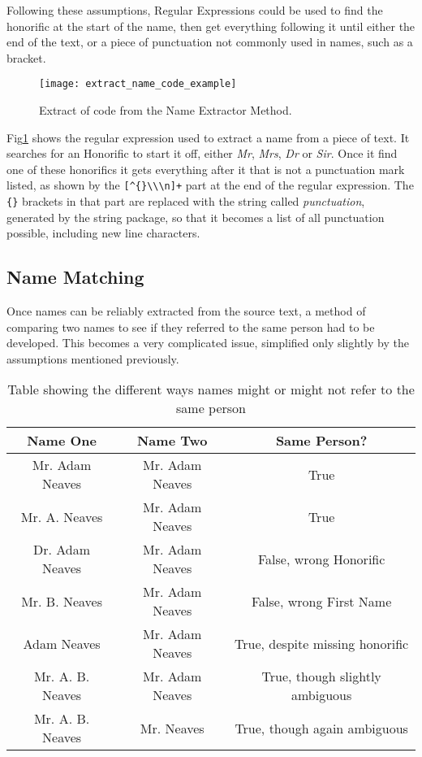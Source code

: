 Following these assumptions, Regular Expressions could be used to find the honorific at the start of the name, then get everything following it until either the end of the text, or a piece of punctuation not commonly used in names, such as a bracket.
\begin{figure}[ht]
\texttt{[image: extract\_name\_code\_example]}
\caption{Extract of code from the Name Extractor Method.}
\label{fig:name_extract_code}
\end{figure}

Fig\ref{fig:name_extract_code} shows the regular expression used to extract a name from a piece of text. It searches for an Honorific to start it off, either \emph{Mr}, \emph{Mrs}, \emph{Dr} or \emph{Sir}. Once it find one of these honorifics it gets everything after it that is not a punctuation mark listed, as shown by the \verb|[^{}\\\n]+| part at the end of the regular expression. The \verb|{}| brackets in that part are replaced with the string called \emph{punctuation}, generated by the string package, so that it becomes a list of all punctuation possible, including new line characters.  

\subsection{Name Matching}
\label{sec:imp_name_match}
Once names can be reliably extracted from the source text, a method of comparing two names to see if they referred to the same person had to be developed. This becomes a very complicated issue, simplified only slightly by the assumptions mentioned previously.

\begin{table}[ht!]
\centering
\begin{tabular}{|c c c|}
Name One & Name Two & Same Person? \\
\hline
Mr. Adam Neaves  & Mr. Adam Neaves & True \\
Mr. A. Neaves    & Mr. Adam Neaves & True \\
Dr. Adam Neaves  & Mr. Adam Neaves & False, wrong Honorific \\
Mr. B. Neaves    & Mr. Adam Neaves & False, wrong First Name \\
Adam Neaves      & Mr. Adam Neaves & True, despite missing honorific \\
Mr. A. B. Neaves & Mr. Adam Neaves & True, though slightly ambiguous \\
Mr. A. B. Neaves & Mr. Neaves      & True, though again ambiguous    \\
\end{tabular}
\caption{Table showing the different ways names might or might not refer to the same person}
\label{tbl:name_match}
\end{table}

